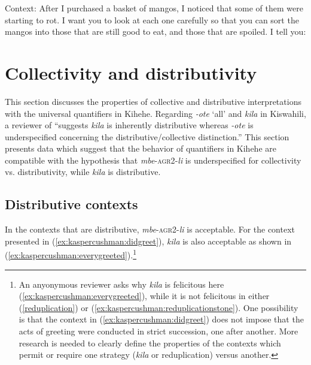 \documentclass[output=paper,modfonts,nonflat]{langsci/langscibook}
\begin{document}
\pagebreak
\begin{exe}

 \ex Context: After I purchased a basket of mangos, I noticed that some of them were starting to rot. I want you to look at each one carefully so that you can sort the mangos into those that are still good to eat, and those that are spoiled. I tell you: \label{ex:kaspercushman:onebyone}
\begin{xlist}


\end{xlist}
\end{exe}


\section{Collectivity and distributivity}
\label{sec:kaspercushman:4}

This section discusses the properties of collective and distributive interpretations with the universal quantifiers in Kihehe. 
Regarding \textit{-ote} `all' and \textit{kila} in Kiswahili, a reviewer of \cite[396]{zerbian08} ``suggests \textit{kila} is inherently distributive whereas \textit{-ote} is underspecified concerning the distributive/collective distinction.''  This section presents data which suggest that the behavior of quantifiers in Kihehe are compatible with the hypothesis that \textit{mbe}-\textsc{agr2}-\textit{li} is underspecified for collectivity vs. distributivity, while \textit{kila} is distributive.

\subsection{Distributive contexts}

In the contexts that are distributive, \textit{mbe}-\textsc{agr2}-\textit{li} is acceptable. For the context presented in (\ref{ex:kaspercushman:didgreet}), \textit{kila} is also acceptable as shown in  (\ref{ex:kaspercushman:everygreeted}).\footnote{An anyonymous reviewer asks why \textit{kila} is felicitous here (\ref{ex:kaspercushman:everygreeted}), while it is not felicitous in either (\ref{reduplication}) or (\ref{ex:kaspercushman:reduplicationstone}). One possibility is that the context in (\ref{ex:kaspercushman:didgreet}) does not impose that the acts of greeting were conducted in strict succession, one after another.  More research is needed to clearly define the properties of the contexts which permit or require one strategy (\textit{kila} or reduplication) versus another.} 
\end{document}
